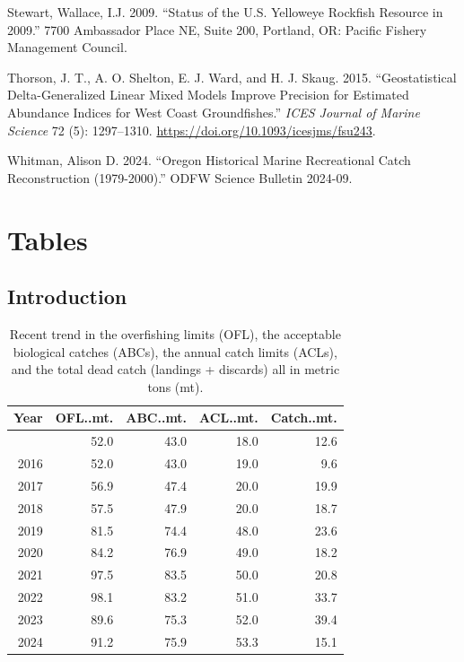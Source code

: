 \documentclass[
]{scrartcl}
\newlength{\cslhangindent}
\newenvironment{CSLReferences}[2] %
 {\begin{list}{}{%
  \setlength{\itemindent}{0pt}
  \setlength{\leftmargin}{0pt}
  \setlength{\parsep}{0pt}
  \ifodd #1
   \setlength{\leftmargin}{\cslhangindent}
   \setlength{\itemindent}{-1\cslhangindent}
  \fi
  \setlength{\itemsep}{#2\baselineskip}}}
 {\end{list}}
\begin{document}
\begin{CSLReferences}{1}{0}
Stewart, Wallace, I.J. 2009. {``Status of the {U}.{S}. Yelloweye
Rockfish Resource in 2009.''} 7700 Ambassador Place NE, Suite 200,
Portland, OR: Pacific Fishery Management Council.

Thorson, J. T., A. O. Shelton, E. J. Ward, and H. J. Skaug. 2015.
{``Geostatistical Delta-Generalized Linear Mixed Models Improve
Precision for Estimated Abundance Indices for {West} {Coast}
Groundfishes.''} \emph{ICES Journal of Marine Science} 72 (5):
1297--1310. \url{https://doi.org/10.1093/icesjms/fsu243}.

Whitman, Alison D. 2024. {``Oregon Historical Marine Recreational Catch
Reconstruction (1979-2000).''} ODFW Science Bulletin 2024-09.

\end{CSLReferences}

\newpage{}

\section{Tables}\label{tables}

\subsection{Introduction}\label{introduction-1}

\begingroup
\fontsize{9.0pt}{10.8pt}\selectfont

\begin{longtable}{rrrrr}

\caption{\label{tbl-yelloweye_management}Recent trend in the overfishing
limits (OFL), the acceptable biological catches (ABCs), the annual catch
limits (ACLs), and the total dead catch (landings + discards) all in
metric tons (mt).}

\tabularnewline

\toprule
Year & OFL..mt. & ABC..mt. & ACL..mt. & Catch..mt. \\ 
\midrule\addlinespace[2.5pt]
2015 & 52.0 & 43.0 & 18.0 & 12.6 \\ 
2016 & 52.0 & 43.0 & 19.0 & 9.6 \\ 
2017 & 56.9 & 47.4 & 20.0 & 19.9 \\ 
2018 & 57.5 & 47.9 & 20.0 & 18.7 \\ 
2019 & 81.5 & 74.4 & 48.0 & 23.6 \\ 
2020 & 84.2 & 76.9 & 49.0 & 18.2 \\ 
2021 & 97.5 & 83.5 & 50.0 & 20.8 \\ 
2022 & 98.1 & 83.2 & 51.0 & 33.7 \\ 
2023 & 89.6 & 75.3 & 52.0 & 39.4 \\ 
2024 & 91.2 & 75.9 & 53.3 & 15.1 \\ 
\bottomrule

\end{longtable}
\end{document}
